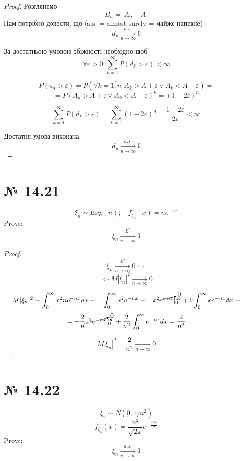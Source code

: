 \documentclass[11pt, a4paper]{article} %
\begin{document}

\begin{proof}
    
    Розглянемо 
    $$B_n = |A_n-A|$$
    Нам потрібно довести, що (a.s. = almost surely = майже напевне)
    $$d_n \xrightarrow[n \to \infty]{a.s.} 0$$
    
    За достатньою умовою збіжності необхідно щоб
    $$\forall \varepsilon>0: \sum_{k=1}^\infty P(d_k > \varepsilon) < \infty$$
    
    $$P(d_n > \varepsilon) = P(\forall k=\overline{1,n}: A_k > A + \varepsilon \vee A_k < A - \varepsilon) = $$
    $$= P(A_k > A + \varepsilon \vee A_k < A - \varepsilon)^n = (1-2\varepsilon)^n$$
    
    $$\sum_{k=1}^\infty P(d_k > \varepsilon) = \sum_{k=1}^\infty (1-2\varepsilon)^n = \frac{1-2\varepsilon}{2\varepsilon} < \infty$$
    
    Достатня умова виконана. $$d_n \xrightarrow[n \to \infty]{a.s.} 0$$
\end{proof}


\section*{№ 14.21}
$$\xi_n \sim Exp(n);\quad f_{\xi_n}(x) = ne^{-nx} $$
Prove:
$$\xi_n \xrightarrow[n\to\infty]{L^2} 0$$

\begin{proof}
    $$\xi_n \xrightarrow[n\to\infty]{L^2} 0 \iff$$
    $$\iff M|\xi_n|^2 \xrightarrow[n\to\infty]{}0$$
    
    $$M|\xi_n|^2 = \int_0^\infty x^2 ne^{-nx}dx = -\int_0^\infty x^2 e^{-nx} = - \cancelto{0}{x^2e^{-nx}}|_0^\infty + 2\int_0^\infty xe^{-nx}dx = $$
    $$= -\frac{2}{n} \cancelto{0}{x^2e^{-nx}}|_0^\infty + \frac{2}{n^2}\int_0^\infty e^{-nx} dx = \frac{2}{n^2}$$
    
    $$M|\xi_n|^2 = \frac{2}{n^2} \xrightarrow[n\to\infty]{}0$$
\end{proof}


\section*{№ 14.22}
$$\xi_n \sim N(0,1/n^2)$$
$$f_{\xi_n}(x) = \frac{n^2}{\sqrt{2 \pi}} e^{-\frac{n^2x^2}{2}}$$
Prove:
$$\xi_n \xrightarrow[n\to\infty]{a.s.}0$$
\end{document}
